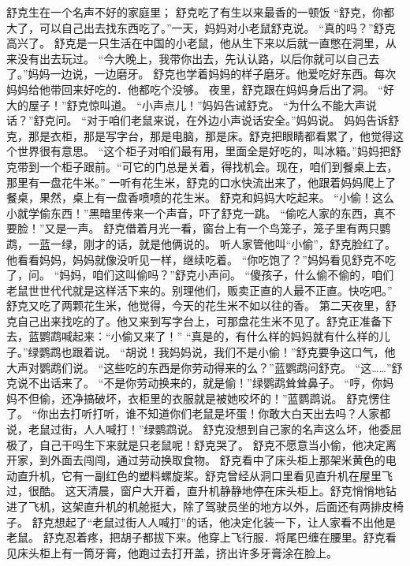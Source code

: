 \documentclass[a4paper,12pt,UTF8,twoside]{ctexbook}
\begin{document}
舒克生在一个名声不好的家庭里；
舒克吃了有生以来最香的一顿饭   
“舒克，你都大了，可以自己出去找东西吃了。”一天，妈妈对小老鼠舒克说。   
“真的吗？”舒克高兴了。  
舒克是一只生活在中国的小老鼠，他从生下来以后就一直憋在洞里，从来没有出去玩过。  
“今大晚上，我带你出去，先认认路，以后你就可以自己去了。”妈妈一边说，一边磨牙。  
舒克也学着妈妈的样子磨牙。他爱吃好东西。每次妈妈给他带回来好吃的．他都吃个没够。  
夜里，舒克跟在妈妈身后出了洞。  
“好大的屋子！”舒克惊叫道。  
“小声点儿！”妈妈告诫舒克。  
“为什么不能大声说话？”舒克问。  
“对于咱们老鼠来说，在外边小声说话安全。”妈妈说。  
妈妈告诉舒克，那是衣柜，那是写字台，那是电脑，那是床。舒克把眼睛都看累了，他觉得这个世界很有意思。  “这个柜子对咱们最有用，里面全是好吃的，叫冰箱。”妈妈把舒克带到一个柜子跟前。“可它的门总是关着，得找机会。现在，咱们到餐桌上去，那里有一盘花牛米。”  
一听有花生米，舒克的口水快流出来了，他跟着妈妈爬上了餐桌，果然，桌上有一盘香喷喷的花生米。  
舒克和妈妈大吃起来。  
“小偷！这么小就学偷东西！”黑暗里传来一个声音，吓了舒克一跳。  
“偷吃人家的东西，真不要脸！”又是一声。  
舒克借着月光一看，窗台上有一个鸟笼子，笼子里有两只鹦鹉，一蓝一绿，刚才的话，就是他俩说的。  
听人家管他叫“小偷”，舒克脸红了。他看看妈妈，妈妈就像没听见一样，继续吃着。  
“你吃饱了？”妈妈看见舒克不吃了，问。  
“妈妈，咱们这叫偷吗？”舒克小声问。  
“傻孩子，什么偷不偷的，咱们老鼠世世代代就是这样活下来的。别理他们，贩卖正直的人最不正直。快吃吧。”  舒克又吃了两颗花生米，他觉得，今天的花生米不如以往的香。  
第二天夜里，舒克自己出来找吃的了。他又来到写字台上，可那盘花生米不见了。舒克正准备下去，蓝鹦鹉喊起来：“小偷又来了！”  
“真是的，有什么样的妈妈就有什么样的儿子。”绿鹦鹉也跟着说。  
“胡说！我妈妈说，我们不是小偷！”舒克要争这口气，他大声对鹦鹉们说。  
“这些吃的东西是你劳动得来的么？”蓝鹦鹉问舒克。  
“这……”舒克说不出话来了。  
“不是你劳动换来的，就是偷！”绿鹦鹉耸耸鼻子。  
“哼，你妈妈不但偷，还净搞破坏，衣柜里的衣服就是被她咬坏的！”蓝鹦鹉说。  
舒克愣住了。  
“你出去打听打听，谁不知道你们老鼠是坏蛋！你敢大白天出去吗？人家都说，老鼠过街，人人喊打！”绿鹦鹉说。  
舒克没想到自己家的名声这么坏，他委屈极了，自己干吗生下来就是只老鼠呢！舒克哭了。  
舒克不愿意当小偷，他决定离开家，到外面去闯闯，通过劳动换取食物。  
舒克看中了床头柜上那架米黄色的电动直升机，它有一副红色的塑料螺旋桨。舒克曾经从洞口里看见直升机在屋里飞过，很酷。  
这天清晨，窗户大开着，直升机静静地停在床头柜上。舒克悄悄地钻进了飞机，这架直升机的机舱挺大，除了驾驶员坐的地方以外，后面还有两排皮椅子。  
舒克想起了“老鼠过街人人喊打”的话，他决定化装一下，让人家看不出他是老鼠。  
舒克忍着疼，把胡子都拔下来。他穿上飞行服．将尾巴缠在腰里。舒克看见床头柜上有一筒牙膏，他跑过去打开盖，挤出许多牙膏涂在脸上。  
\end{document}

